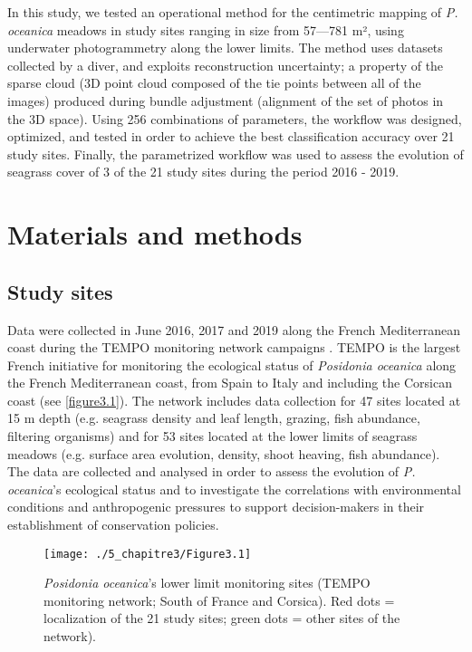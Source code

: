 In this study, we tested an operational method for the centimetric mapping of \textit{P. oceanica} meadows in study sites ranging in size from 57---781 m², using underwater photogrammetry along the lower limits. The method uses datasets collected by a diver, and exploits reconstruction uncertainty; a property of the sparse cloud (3D point cloud composed of the tie points between all of the images) produced during bundle adjustment (alignment of the set of photos in the 3D space). Using 256 combinations of parameters, the workflow was designed, optimized, and tested in order to achieve the best classification accuracy over 21 study sites. Finally, the parametrized workflow was used to assess the evolution of seagrass cover of 3 of the 21 study sites during the period 2016 - 2019.


\section{Materials and methods}\label{chapitre3_2}

\subsection{Study sites}
Data were collected in June 2016, 2017 and 2019 along the French Mediterranean coast during the TEMPO monitoring network campaigns \citep{andromede-oceanologie_tempo_2020}. TEMPO is the largest French initiative for monitoring the ecological status of \textit{Posidonia oceanica} along the French Mediterranean coast, from Spain to Italy and including the Corsican coast (see \autoref{figure3.1}). The network includes data collection for 47 sites located at 15 m depth (e.g. seagrass density and leaf length, grazing, fish abundance, filtering organisms) and for 53 sites located at the lower limits of seagrass meadows (e.g. surface area evolution, density, shoot heaving, fish abundance). The data are collected and analysed in order to assess the evolution of \textit{P. oceanica}’s ecological status and to investigate the correlations with environmental conditions and anthropogenic pressures to support decision-makers in their establishment of conservation policies.


\begin{figure}[H]
	\begin{center}
	\texttt{[image: ./5\_chapitre3/Figure3.1]}
		\caption[\textit{Posidonia oceanica}’s lower limit monitoring sites.]{\textit{Posidonia oceanica}’s lower limit monitoring sites (TEMPO monitoring network; South of France and Corsica). Red dots = localization of the 21 study sites; green dots = other sites of the network).}
	\label{figure3.1}
\end{center}
\end{figure}


